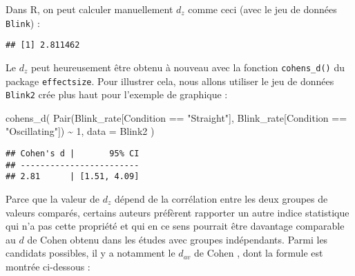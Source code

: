 \documentclass[
]{book}
\newenvironment{Shaded}{\begin{snugshade}}{\end{snugshade}}
\newcommand{\AttributeTok}[1]{\textcolor[rgb]{0.77,0.63,0.00}{#1}}
\newcommand{\CommentTok}[1]{\textcolor[rgb]{0.56,0.35,0.01}{\textit{#1}}}
\newcommand{\DecValTok}[1]{\textcolor[rgb]{0.00,0.00,0.81}{#1}}
\newcommand{\FunctionTok}[1]{\textcolor[rgb]{0.00,0.00,0.00}{#1}}
\newcommand{\NormalTok}[1]{#1}
\newcommand{\OtherTok}[1]{\textcolor[rgb]{0.56,0.35,0.01}{#1}}
\newcommand{\SpecialCharTok}[1]{\textcolor[rgb]{0.00,0.00,0.00}{#1}}
\newcommand{\StringTok}[1]{\textcolor[rgb]{0.31,0.60,0.02}{#1}}
\begin{document}
Dans R, on peut calculer manuellement \(d_z\) comme ceci (avec le jeu de données \texttt{Blink}) :

\begin{Shaded}
\end{Shaded}

\begin{verbatim}
## [1] 2.811462
\end{verbatim}

Le \(d_{z}\) peut heureusement être obtenu à nouveau avec la fonction \texttt{cohens\_d()} du package \texttt{effectsize}. Pour illustrer cela, nous allons utiliser le jeu de données \texttt{Blink2} crée plus haut pour l'exemple de graphique :

\begin{Shaded}
\begin{Highlighting}[]
\FunctionTok{cohens\_d}\NormalTok{(}
  \FunctionTok{Pair}\NormalTok{(Blink\_rate[Condition }\SpecialCharTok{==} \StringTok{"Straight"}\NormalTok{], Blink\_rate[Condition }\SpecialCharTok{==} \StringTok{"Oscillating"}\NormalTok{]) }\SpecialCharTok{\textasciitilde{}} \DecValTok{1}\NormalTok{, }
  \AttributeTok{data =}\NormalTok{ Blink2}
\NormalTok{  )}
\end{Highlighting}
\end{Shaded}

\begin{verbatim}
## Cohen's d |       95% CI
## ------------------------
## 2.81      | [1.51, 4.09]
\end{verbatim}

Parce que la valeur de \(d_z\) dépend de la corrélation entre les deux groupes de valeurs comparés, certains auteurs préfèrent rapporter un autre indice statistique qui n'a pas cette propriété et qui en ce sens pourrait être davantage comparable au \(d\) de Cohen obtenu dans les études avec groupes indépendants. Parmi les candidats possibles, il y a notamment le \(d_{av}\) de Cohen \autocite{lakensCalculatingReportingEffect2013}, dont la formule est montrée ci-dessous :
\end{document}
